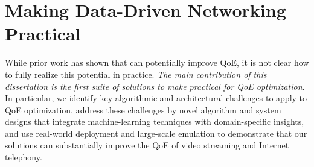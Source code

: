 
%
%
%
%

\section{Making Data-Driven Networking Practical}

While prior work has shown that \ddn can potentially improve QoE, it is not 
clear how to fully realize this potential in practice.
{\em The main contribution of this dissertation is the first suite of solutions 
to make \ddn practical for QoE optimization}. In particular, 
we identify key algorithmic and architectural challenges to apply \ddn to 
QoE optimization, address these challenges by novel algorithm and system 
designs that integrate machine-learning techniques with domain-specific  insights,
and use real-world deployment and large-scale 
emulation to demonstrate that our solutions can substantially improve 
the QoE of video streaming and Internet telephony.

